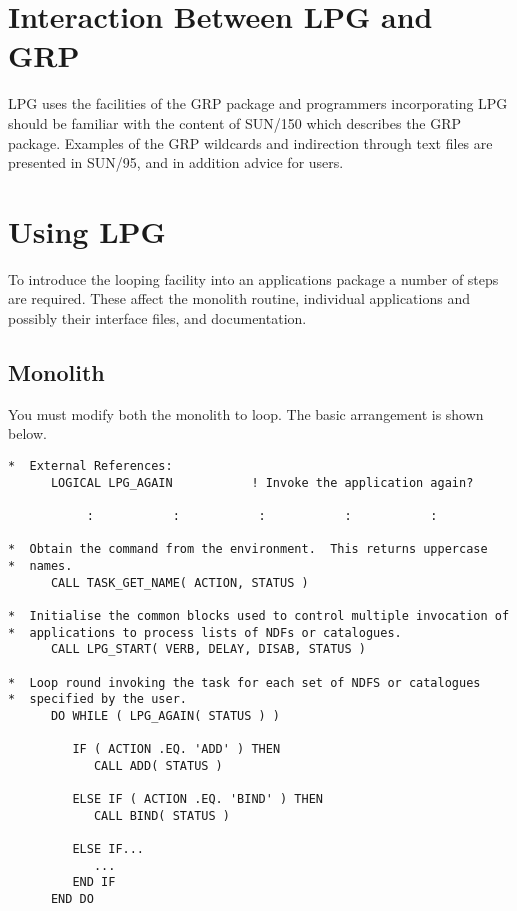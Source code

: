 \documentclass[twoside,11pt]{article}
\newcommand{\xref}[3]{#1}
\renewcommand{\_}{\texttt{\symbol{95}}}
\begin{document}
\section {Interaction Between LPG and GRP}

LPG uses the facilities of the \xref{GRP}{sun150}{} package and
programmers incorporating LPG should be familiar with the content of
\xref{SUN/150}{sun150}{} which describes the GRP package.
Examples of the GRP wildcards and indirection through text files
are presented in \xref{SUN/95}{sun95}{se_multinvoc}, and in addition
advice for users.

\newpage
\section{Using LPG}

To introduce the looping facility into an applications package
a number of steps are required.  These affect the monolith routine,
individual applications and possibly their interface files, and
documentation.

\subsection{Monolith}

You must modify both the monolith to loop.  The basic arrangement is
shown below.

\small
\begin{verbatim}
*  External References:
      LOGICAL LPG_AGAIN           ! Invoke the application again?

           :           :           :           :           :

*  Obtain the command from the environment.  This returns uppercase
*  names.
      CALL TASK_GET_NAME( ACTION, STATUS )

*  Initialise the common blocks used to control multiple invocation of
*  applications to process lists of NDFs or catalogues.
      CALL LPG_START( VERB, DELAY, DISAB, STATUS )

*  Loop round invoking the task for each set of NDFS or catalogues
*  specified by the user.
      DO WHILE ( LPG_AGAIN( STATUS ) )

         IF ( ACTION .EQ. 'ADD' ) THEN
            CALL ADD( STATUS )

         ELSE IF ( ACTION .EQ. 'BIND' ) THEN
            CALL BIND( STATUS )

         ELSE IF...
            ...
         END IF
      END DO
\end{verbatim}
\normalsize
\end{document}
